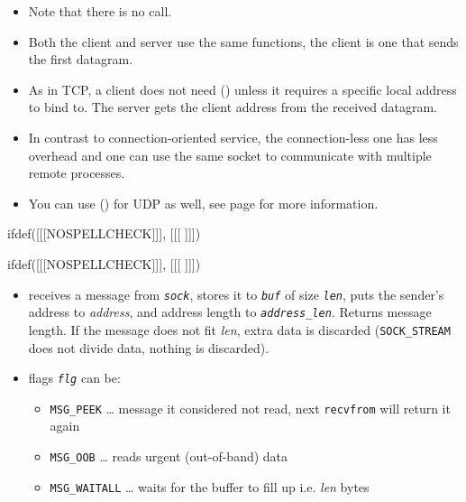 \begin{slide}

\end{slide}

\begin{itemize}
\item Note that there is no  call.
\item Both the client and server use the same functions, the client is one that
sends the first datagram.
\item As in TCP, a client does not need () unless it requires a
specific local address to bind to.  The server gets the client address from the
received datagram.
\item In contrast to connection-oriented service, the connection-less one has
less overhead and one can use the same socket to communicate with multiple
remote processes.
\item You can use () for UDP as well, see page
\pageref{CONNECT_FOR_UDP} for more information.
\end{itemize}


ifdef([[[NOSPELLCHECK]]], [[[
]]])

\begin{slide}
\setlength{\baselineskip}{0.8\baselineskip}
ifdef([[[NOSPELLCHECK]]], [[[
]]])
\begin{itemize}
\item receives a message from \emph{\texttt{sock}}, stores it to
\emph{\texttt{buf}}
of size \emph{\texttt{l{}en}}, puts the sender's address to \emph{address},
and address length to \emph{\texttt{address\_len}}.  Returns message length.
If the message does not fit \emph{l{}en}, extra data is discarded
(\texttt{SOCK\_STREAM} does not divide data, nothing is discarded).
\item flags \emph{\texttt{flg}} can be:
    \begin{itemize}
    \item \texttt{MSG\_PEEK} \dots{} message it considered not read, next
    \texttt{recvfrom} will return it again
    \item \texttt{MSG\_OOB} \dots{} reads urgent (out-of-band) data
    \item \texttt{MSG\_WAITALL} \dots{} waits for the buffer to fill up
    i.e. \emph{l{}en} bytes
    \end{itemize}
\end{itemize}
\end{slide}

